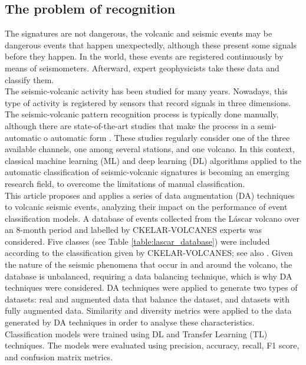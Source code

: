 \documentclass[journal]{IEEEtran}
\begin{document}
\subsection{The problem of recognition}
The signatures are not dangerous, the volcanic and seismic events may be dangerous events that happen unexpectedly, although these present some signals before they happen. In the world, these events are registered continuously by means of seismometers. Afterward, expert geophysicists take these data and classify them.\\
The seismic-volcanic activity has been studied for many years. Nowadays, this type of activity is registered by sensors that record signals in three dimensions. The seismic-volcanic pattern recognition process is typically done manually, although there are state-of-the-art studies that make the process in a semi-automatic o automatic form \cite{salazar2022multi,salazar2020deep,malfante2018automatic,bicego2012classification,curilem2016pattern, lara2020automatic}. These studies regularly consider one of the three available channels, one among several stations, and one volcano.
In this context, classical machine learning (ML) and deep learning (DL) algorithms applied to the automatic classification of seismic-volcanic signatures is becoming an emerging research field, to overcome the limitations of manual classification.\\
This article proposes and applies a series of data augmentation (DA) techniques to volcanic seismic events, analyzing their impact on the performance of event classification models.  A database of events collected from the Láscar volcano over an 8-month period and labelled by CKELAR-VOLCANES experts was considered. Five classes (see Table \ref{table:lascar_database}) were included according to the classification given by CKELAR-VOLCANES; see also \cite{salazar2022multi}. Given the nature of the seismic phenomena that occur in and around the volcano, the database is unbalanced, requiring a data balancing technique, which is why DA techniques were considered.
DA techniques were applied to generate two types of datasets: real and augmented data that balance the dataset, and datasets with fully augmented data. Similarity and diversity metrics were applied to the data generated by DA techniques in order to analyse these characteristics. Classification models were trained using DL and Transfer Learning (TL) techniques. The models were evaluated using precision, accuracy, recall, F1 score, and confusion matrix metrics.\\
\end{document}
